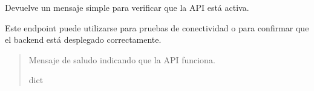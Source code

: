 \documentclass[letterpaper,10pt,spanish]{sphinxmanual}
\begin{document}
\begin{fulllineitems}
\label{\detokenize{endpoints:main.saludo}}
\pysigstartsignatures
\pysiglinewithargsret
{}
{}
{}
\pysigstopsignatures
\sphinxAtStartPar
Devuelve un mensaje simple para verificar que la API está activa.

\sphinxAtStartPar
Este endpoint puede utilizarse para pruebas de conectividad o para confirmar que el backend está desplegado correctamente.
\begin{quote}\begin{description}
\sphinxAtStartPar
Mensaje de saludo indicando que la API funciona.

\sphinxAtStartPar
dict

\end{description}\end{quote}

\end{fulllineitems}

\end{document}
